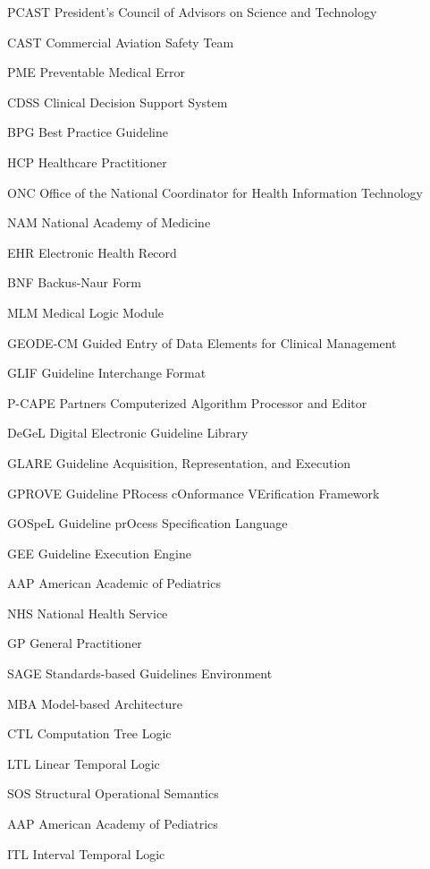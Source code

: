 \documentclass{uiucthesis2021}
\begin{document}
\begin{abbrevlist}
\item[PCAST]    President's Council of Advisors on Science and Technology
\item[CAST]     Commercial Aviation Safety Team
\item[PME]      Preventable Medical Error
\item[CDSS]     Clinical Decision Support System
\item[BPG]      Best Practice Guideline
\item[HCP]      Healthcare Practitioner
\item[ONC]      Office of the National Coordinator for Health Information Technology
\item[NAM]      National Academy of Medicine
\item[EHR]      Electronic Health Record
\item[BNF]      Backus-Naur Form
\item[MLM]      Medical Logic Module
\item[GEODE-CM] Guided Entry of Data Elements for Clinical Management
\item[GLIF]     Guideline Interchange Format
\item[P-CAPE]   Partners Computerized Algorithm Processor and Editor
\item[DeGeL]    Digital Electronic Guideline Library
\item[GLARE]    Guideline Acquisition, Representation, and Execution
\item[GPROVE]   Guideline PRocess cOnformance VErification Framework
\item[GOSpeL]   Guideline prOcess Specification Language
\item[GEE]      Guideline Execution Engine
\item[AAP]      American Academic of Pediatrics
\item[NHS]      National Health Service
\item[GP]       General Practitioner
\item[SAGE]     Standards-based Guidelines Environment
\item[MBA]      Model-based Architecture
\item[CTL]      Computation Tree Logic
\item[LTL]      Linear Temporal Logic
\item[SOS]      Structural Operational Semantics
\item[AAP]      American Academy of Pediatrics
\item[ITL]      Interval Temporal Logic
\end{abbrevlist}
\end{document}

